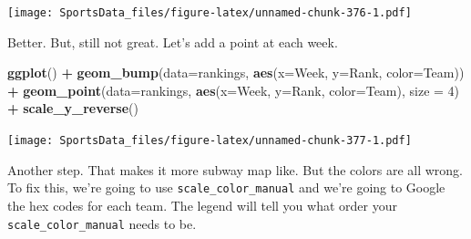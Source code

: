\documentclass[
]{book}
\newenvironment{Shaded}{\begin{snugshade}}{\end{snugshade}}
\newcommand{\DataTypeTok}[1]{\textcolor[rgb]{0.13,0.29,0.53}{#1}}
\newcommand{\DecValTok}[1]{\textcolor[rgb]{0.00,0.00,0.81}{#1}}
\newcommand{\KeywordTok}[1]{\textcolor[rgb]{0.13,0.29,0.53}{\textbf{#1}}}
\newcommand{\NormalTok}[1]{#1}
\newcommand{\OperatorTok}[1]{\textcolor[rgb]{0.81,0.36,0.00}{\textbf{#1}}}
\newcommand{\StringTok}[1]{\textcolor[rgb]{0.31,0.60,0.02}{#1}}
\begin{document}
\texttt{[image: SportsData\_files/figure-latex/unnamed-chunk-376-1.pdf]}

Better. But, still not great. Let's add a point at each week.

\begin{Shaded}
\begin{Highlighting}[]
\KeywordTok{ggplot}\NormalTok{() }\OperatorTok{+}\StringTok{ }
\StringTok{  }\KeywordTok{geom_bump}\NormalTok{(}\DataTypeTok{data=}\NormalTok{rankings, }\KeywordTok{aes}\NormalTok{(}\DataTypeTok{x=}\NormalTok{Week, }\DataTypeTok{y=}\NormalTok{Rank, }\DataTypeTok{color=}\NormalTok{Team)) }\OperatorTok{+}\StringTok{ }
\StringTok{  }\KeywordTok{geom_point}\NormalTok{(}\DataTypeTok{data=}\NormalTok{rankings, }\KeywordTok{aes}\NormalTok{(}\DataTypeTok{x=}\NormalTok{Week, }\DataTypeTok{y=}\NormalTok{Rank, }\DataTypeTok{color=}\NormalTok{Team), }\DataTypeTok{size =} \DecValTok{4}\NormalTok{) }\OperatorTok{+}
\StringTok{  }\KeywordTok{scale_y_reverse}\NormalTok{() }
\end{Highlighting}
\end{Shaded}

\texttt{[image: SportsData\_files/figure-latex/unnamed-chunk-377-1.pdf]}

Another step. That makes it more subway map like. But the colors are all wrong. To fix this, we're going to use \texttt{scale\_color\_manual} and we're going to Google the hex codes for each team. The legend will tell you what order your \texttt{scale\_color\_manual} needs to be.

\begin{Shaded}
\end{Shaded}
\end{document}
